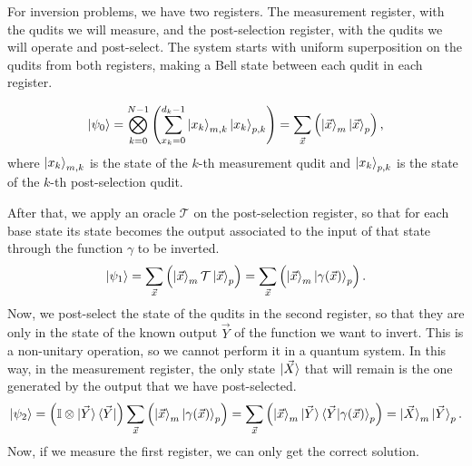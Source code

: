 For inversion problems, we have two registers. The measurement register, with the qudits we will measure, and the post-selection register, with the qudits we will operate and post-select. 
The system starts with uniform superposition on the qudits from both registers, making a Bell state between each qudit in each register.

\begin{equation}
    \ket{\psi_0} = \bigotimes_{k=0}^{N-1} \left(\sum_{x_k=0}^{d_k-1} \ket{x_k}_{m,k}\ket{x_k}_{p,k}\right)=\sum_{\vec{x}}\left(\ket{\vec{x}}_{m}\ket{\vec{x}}_{p}\right),
\end{equation}
where $\ket{x_k}_{m,k}$ is the state of the $k$-th measurement qudit and $\ket{x_k}_{p,k}$ is the state of the $k$-th post-selection qudit.

After that, we apply an oracle $\mathcal{T}$ on the post-selection register, so that for each base state its state becomes the output associated to the input of that state through the function $\gamma$ to be inverted.
\begin{equation}
    \ket{\psi_1} = \sum_{\vec{x}}\left( \ket{\vec{x}}_{m}\mathcal{T}\ket{\vec{x}}_{p}\right)=\sum_{\vec{x}} \left( \ket{\vec{x}}_{m}\ket{\gamma(\vec{x})}_{p}\right).
\end{equation}
Now, we post-select the state of the qudits in the second register, so that they are only in the state of the known output $\vec{Y}$ of the function we want to invert. This is a non-unitary operation, so we cannot perform it in a quantum system. In this way, in the measurement register, the only state $\ket{\vec{X}}$ that will remain is the one generated by the output that we have post-selected.
\begin{equation}
    \ket{\psi_2} = \left(\mathbb{I}\otimes \ket{\vec{Y}}\bra{\vec{Y}}\right)  \sum_{\vec{x}} \left( \ket{\vec{x}}_{m}\ket{\gamma(\vec{x})}_{p}\right) = \sum_{\vec{x}} \left( \ket{\vec{x}}_{m}\ket{\vec{Y}}\braket{\vec{Y}|\gamma(\vec{x})}_{p}\right) = \ket{\vec{X}}_{m}\ket{\vec{Y}}_p.
\end{equation}
Now, if we measure the first register, we can only get the correct solution.

